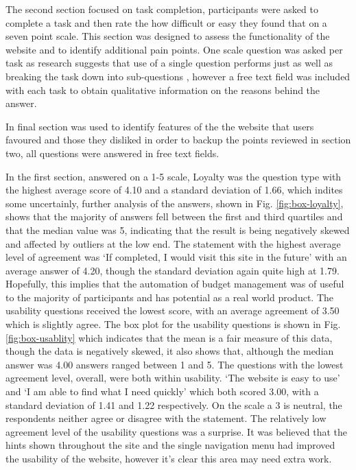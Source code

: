 The second section focused on task completion, participants were asked to complete a task and then rate the how difficult or easy they found that on a seven point scale.
%
This section was designed to assess the functionality of the website and to identify additional pain points.
%
One scale question was asked per task as research suggests that use of a single question performs just as well as breaking the task down into sub-questions \parencite{sauro2009comparison, sauro2009correlations}, however a free text field was included with each task to obtain qualitative information on the reasons behind the answer.

In final section was used to identify features of the the website that users favoured and those they disliked in order to backup the points reviewed in section two, all questions were answered in free text fields.

In the first section, answered on a 1-5 scale, Loyalty was the question type with the highest average score of 4.10 and a standard deviation of 1.66, which indites some uncertainly, further analysis of the answers, shown in Fig. \ref{fig:box-loyalty}, shows that the majority of answers fell between the first and third quartiles and that the median value was 5, indicating that the result is being negatively skewed and affected by outliers at the low end.
%
The statement with the highest average level of agreement was `If completed, I would visit this site in the future' with an average answer of 4.20, though the standard deviation again quite high at 1.79. Hopefully, this implies that the automation of budget management was of useful to the majority of participants and has potential as a real world product.
%
The usability questions received the lowest score, with an average agreement of 3.50 which is slightly agree. The box plot for the usability questions is shown in Fig. \ref{fig:box-usablity} which indicates that the mean is a fair measure of this data, though the data is negatively skewed, it also shows that, although the median answer was 4.00 answers ranged between 1 and 5.
%
The questions with the lowest agreement level, overall, were both within usability. `The website is easy to use' and `I am able to find what I need quickly' which both scored 3.00, with a standard deviation of 1.41 and 1.22 respectively. On the scale a 3 is neutral, the respondents neither agree or disagree with the statement.
%
The relatively low agreement level of the usability questions was a surprise. It was believed that the hints shown throughout the site and the single navigation menu had improved the usability of the website, however it's clear this area may need extra work.

